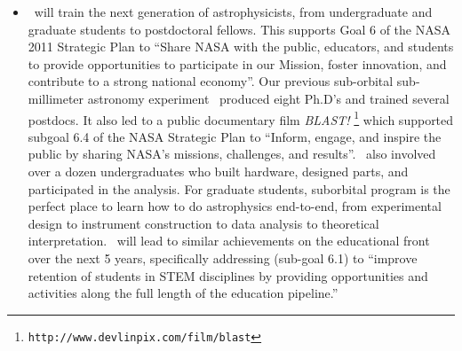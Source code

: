 \begin{itemize}
\item
\name\ will train the next generation of astrophysicists, from undergraduate and graduate students to postdoctoral
fellows.  This supports Goal 6 of the NASA 2011 Strategic Plan
to ``Share NASA with the public, educators, and students to provide
opportunities to participate in our Mission, foster innovation, and
contribute to a strong national economy''. Our previous sub-orbital
sub-millimeter astronomy experiment \blast\ produced eight Ph.D's and
trained several postdocs.  It also led to a public documentary film
{\em BLAST!} \footnote{\tt http://www.devlinpix.com/film/blast} which
supported subgoal 6.4 of the NASA Strategic Plan to ``Inform, engage,
and inspire the public by sharing NASA's missions, challenges, and
results''.  \blast\ also involved over a dozen undergraduates who
built hardware, designed parts, and participated in the analysis.  For
graduate students, suborbital program is the perfect place to learn
how to do astrophysics end-to-end, from experimental design to
instrument construction to data analysis to theoretical
interpretation.  \name\ will lead to similar achievements on the
educational front over the next 5 years, specifically addressing
(sub-goal 6.1) to ``improve retention of students in STEM disciplines
by providing opportunities and activities along the full length of the
education pipeline.''


\end{itemize}

